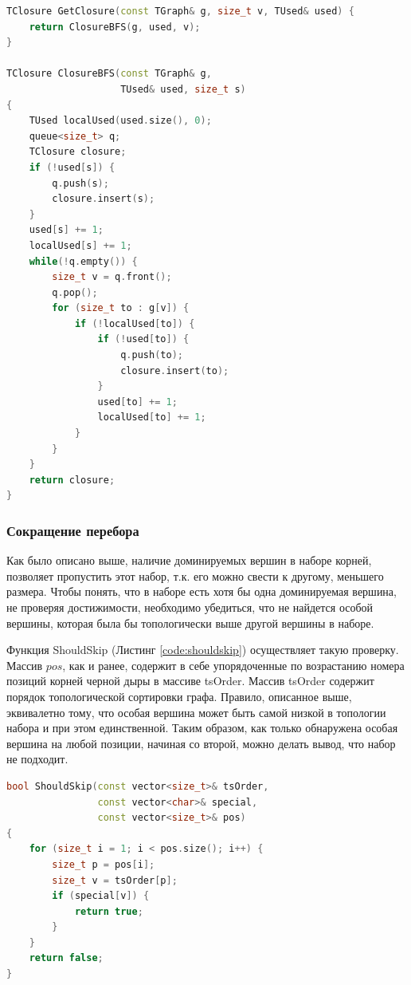 \documentclass[12pt,a4paper,oneside,openany]{article}
\theoremstyle{definition}
\theoremstyle{lemma}
\theoremstyle{remark}
\begin{document}
\begin{lstlisting}[language=C++, caption=Обход замыкания, label=code:getclosure]
TClosure GetClosure(const TGraph& g, size_t v, TUsed& used) {
    return ClosureBFS(g, used, v);
}

TClosure ClosureBFS(const TGraph& g,
                    TUsed& used, size_t s)
{
    TUsed localUsed(used.size(), 0);
    queue<size_t> q;
    TClosure closure;
    if (!used[s]) {
        q.push(s);
        closure.insert(s);
    }
    used[s] += 1;
    localUsed[s] += 1;
    while(!q.empty()) {
        size_t v = q.front();
        q.pop();
        for (size_t to : g[v]) {
            if (!localUsed[to]) {
                if (!used[to]) {
                    q.push(to);
                    closure.insert(to);
                }
                used[to] += 1;
                localUsed[to] += 1;
            }
        }
    }
    return closure;
}
\end{lstlisting}

\subsubsection{Сокращение перебора}\label{subsubsec:shouldskip}

Как было описано выше, наличие доминируемых вершин в наборе корней,
позволяет пропустить этот набор, т.к. его можно свести к другому,
меньшего размера. Чтобы понять, что в наборе есть хотя бы одна
доминируемая вершина, не проверяя достижимости,
необходимо убедиться, что не найдется особой вершины,
которая была бы топологически выше другой вершины в наборе.

Функция ShouldSkip (Листинг \ref{code:shouldskip}) осуществляет такую проверку.
Массив $pos$, как и ранее, содержит в себе упорядоченные по
возрастанию номера позиций корней черной дыры в массиве tsOrder.
Массив tsOrder содержит порядок топологической сортировки графа.
Правило, описанное выше, эквивалетно тому, что особая вершина может быть
самой низкой в топологии набора и при этом единственной.
Таким образом, как только обнаружена особая вершина на любой
позиции, начиная со второй, можно делать вывод, что набор не подходит.

\begin{lstlisting}[language=C++, caption=Проверка на доминируемость вершин, label=code:shouldskip]
bool ShouldSkip(const vector<size_t>& tsOrder,
                const vector<char>& special,
                const vector<size_t>& pos)
{
    for (size_t i = 1; i < pos.size(); i++) {
        size_t p = pos[i];
        size_t v = tsOrder[p];
        if (special[v]) {
            return true;
        }
    }
    return false;
}
\end{lstlisting}
\end{document}
